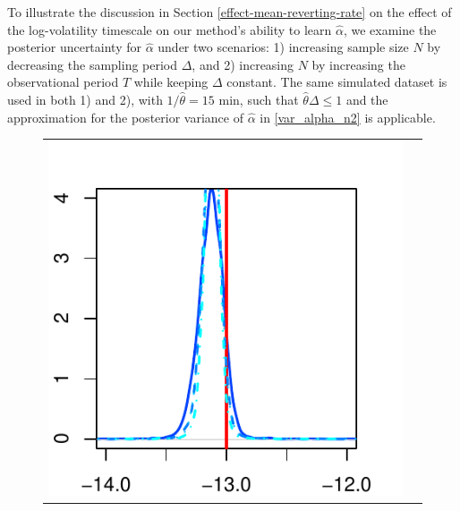\documentclass[10pt]{article}
\newcommand{\htheta}{\hat{\theta}}
\newcommand{\halpha}{\hat{\alpha}}
\begin{document}
To illustrate the discussion in Section \ref{effect-mean-reverting-rate} on the effect of the log-volatility timescale on our method's ability to learn $\halpha$, we examine the posterior uncertainty for $\halpha$ under two scenarios: 1) increasing sample size $N$ by decreasing the sampling period $\Delta$, and 2) increasing $N$ by increasing the observational period $T$ while keeping $\Delta$ constant. The same simulated dataset is used in both 1) and 2), with $1/\htheta = 15 \mbox{ min}$, such that $\htheta \Delta \leq 1$ and the approximation for the posterior variance of $\halpha$ in \eqref{var_alpha_n2} is applicable.
\begin{figure}[h!]
\centering
\begin{tabular}{cc}
			\begin{minipage}{0.45\textwidth}
				\centering
				\includegraphics[width=1\linewidth]{results-simulation-10013-bid-ask-noise-plots-ALPHAS-microstructure-ALPHA-XI-Inf-SDs-0.pdf}
			\end{minipage}
			& \begin{minipage}{0.45\textwidth}
				\centering

\end{minipage}
\end{tabular}
\end{figure}
\end{document}

